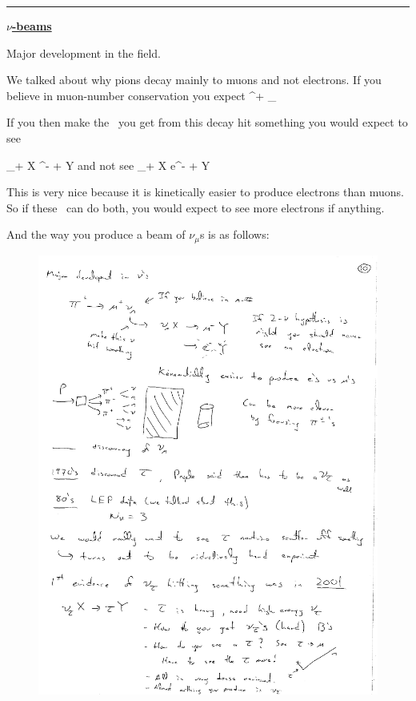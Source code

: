 {\noindent\rule{\textwidth}{1pt}

\textbf{\underline{$\nu$-beams} }

Major development in the field.

We talked about why pions decay mainly to muons and not electrons. 
If you believe in muon-number conservation you expect
\be 
\pi \rightarrow \mu^+ \nu_\mu
\ee 

If you then make the \nus\ you get from this decay hit something you would expect to see

\be
\nu_\mu + X \rightarrow \mu^- + Y
\ee
and not see
\be
\nu_\mu + X \rightarrow e^- + Y
\ee

This is very nice because it is kinetically easier to produce electrons than muons. 
So if these \nus\ can do both, you would expect to see more electrons if anything. 

And the way you produce a beam of $\nu_\mu$s is as follows:

\begin{figure}[h!]
\centering
\includegraphics[width=1.0\textwidth]{./NuBeam.pdf}
\end{figure}

}
